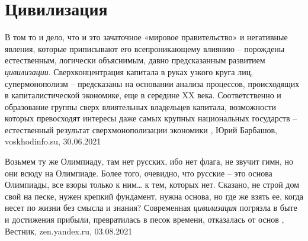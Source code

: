  
 
 
 
 
\chapter{Цивилизация}

В том то и дело, что и это зачаточное «мировое правительство» и негативные
явления, которые приписывают его всепроникающему влиянию – порождены
естественным, логически объяснимым, давно предсказанным развитием \emph{цивилизации}.
Сверхконцентрация капитала в руках узкого круга лиц, супермонополизм –
предсказаны на основании анализа процессов, происходящих в капиталистической
экономике, еще в середине XX века. Соответственно и образование группы сверх
влиятельных владельцев капитала, возможности которых превосходят интересы даже
самых крупных национальных государств – естественный результат
сверхмонополизации экономики
, 
Юрий Барбашов, voskhodinfo.su, 30.06.2021

Возьмем ту же Олимпиаду, там нет русских, ибо нет флага, не звучит гимн, но они
всюду на Олимпиаде. Более того, очевидно, что русские – это основа Олимпиады,
все взоры только к ним… к тем, которых нет.  Сказано, не строй дом свой на
песке, нужен крепкий фундамент, нужна основа, но где же взять ее, когда несет
по жизни без смысла и знания? Современная \emph{цивилизация} погрязла в быте и
достижения прибыли, превратилась в песок времени, отказалась от основ
, Вестник, zen.yandex.ru, 03.08.2021

